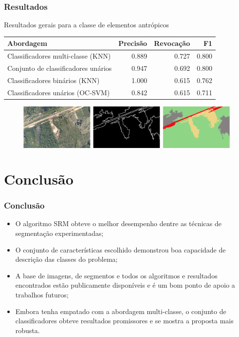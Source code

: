 \documentclass[t]{beamer}
\begin{document}
\begin{frame}[c]
	\frametitle{Resultados}
	
	\centering
	Resultados gerais para a classe de elementos antrópicos

	\small{
		\begin{table}[h]
		\centering
		\begin{tabulary}{\linewidth}{|L|R|R|R|}
		\hline
		\textbf{Abordagem}  & \textbf{Precisão} & \textbf{Revocação} & \textbf{F1} \\ \hline
		Classificadores multi-classe (KNN)   & 0.889 & 0.727 & 0.800 \\ \hline
		Conjunto de classificadores unários  & 0.947 & 0.692 & 0.800 \\ \hline
		Classificadores binários (KNN)       & 1.000 & 0.615 & 0.762 \\ \hline
		Classificadores unários (OC-SVM)     & 0.842 & 0.615 & 0.711 \\ \hline
		\end{tabulary}
		\end{table}
	}

	\begin{figure}
		\includegraphics[width=\textwidth]{imgs/resultado_final}
	\end{figure}
\end{frame}


\section{Conclusão}

\begin{frame}[c]
	\frametitle{Conclusão}

	\begin{itemize}
		\item O algoritmo SRM obteve o melhor desempenho dentre as técnicas de segmentação experimentadas;
		\item O conjunto de características escolhido demonstrou boa capacidade de descrição das classes do problema;
		\item A base de imagens, de segmentos e todos os algoritmos e resultados encontrados estão publicamente disponíveis e é um bom ponto de apoio a trabalhos futuros;
		\item Embora tenha empatado com a abordagem multi-classe, o conjunto de classificadores obteve resultados promissores e se mostra a proposta mais robusta.
	\end{itemize}
\end{frame}
\end{document}
